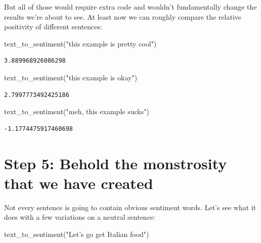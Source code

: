 \documentclass[]{book}
\newenvironment{Shaded}{\begin{snugshade}}{\end{snugshade}}
\newcommand{\StringTok}[1]{\textcolor[rgb]{0.31,0.60,0.02}{#1}}
\newcommand{\NormalTok}[1]{#1}
\theoremstyle{definition}
\theoremstyle{definition}
\theoremstyle{definition}
\theoremstyle{remark}
\begin{document}
But all of those would require extra code and wouldn't fundamentally
change the results we're about to see. At least now we can roughly
compare the relative positivity of different sentences:

\begin{Shaded}
\begin{Highlighting}[]
\NormalTok{text_to_sentiment(}\StringTok{"this example is pretty cool"}\NormalTok{)}
\end{Highlighting}
\end{Shaded}

\begin{verbatim}
3.889968926086298
\end{verbatim}

\begin{Shaded}
\begin{Highlighting}[]
\NormalTok{text_to_sentiment(}\StringTok{"this example is okay"}\NormalTok{)}
\end{Highlighting}
\end{Shaded}

\begin{verbatim}
2.7997773492425186
\end{verbatim}

\begin{Shaded}
\begin{Highlighting}[]
\NormalTok{text_to_sentiment(}\StringTok{"meh, this example sucks"}\NormalTok{)}
\end{Highlighting}
\end{Shaded}

\begin{verbatim}
-1.1774475917460698
\end{verbatim}

\section{Step 5: Behold the monstrosity that we have
created}\label{step-5-behold-the-monstrosity-that-we-have-created}

Not every sentence is going to contain obvious sentiment words. Let's
see what it does with a few variations on a neutral sentence:

\begin{Shaded}
\begin{Highlighting}[]
\NormalTok{text_to_sentiment(}\StringTok{"Let's go get Italian food"}\NormalTok{)}
\end{Highlighting}
\end{Shaded}
\end{document}
